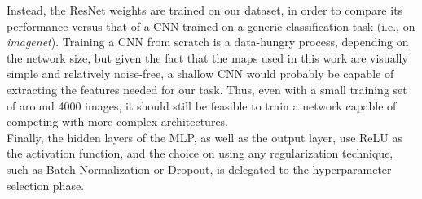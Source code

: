 Instead, the ResNet weights are trained on our dataset, in order to compare its performance versus that of a CNN trained on a generic classification task (i.e., on \textit{imagenet}). Training a CNN from scratch is a data-hungry process, depending on the network size, but given the fact that the maps used in this work are visually simple and relatively noise-free, a shallow CNN would probably be capable of extracting the features needed for our task. Thus, even with a small training set of around 4000 images, it should still be feasible to train a network capable of competing with more complex architectures.\\


\noindent
Finally, the hidden layers of the MLP, as well as the output layer, use ReLU as the activation function, and the choice on using any regularization technique, such as Batch Normalization or Dropout, is delegated to the hyperparameter selection phase.
